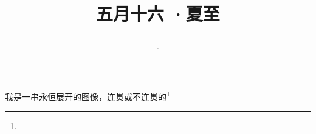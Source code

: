 \title{\date[d=21,m=6,y=2024][year:cn-y,年,month:cn,day:cn,日,·,weekday]·五月十六 ·夏至}
我是一串永恒展开的图像，连贯或不连贯的\footnote{ }

